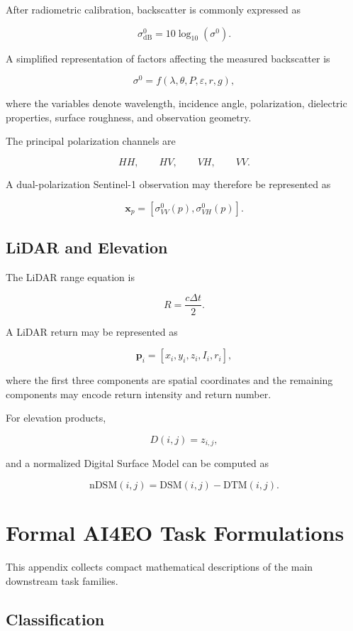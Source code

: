 \documentclass[
    11pt,
    a4paper,
    parskip=half,
    bibliography=totoc,
    numbers=noenddot
]{scrartcl}
\begin{document}
After radiometric calibration, backscatter is commonly expressed as

\[
\sigma^0_{\mathrm{dB}}
=
10\log_{10}(\sigma^0).
\]

A simplified representation of factors affecting the measured
backscatter is

\[
\sigma^0 =
f(\lambda,\theta,P,\varepsilon,r,g),
\]

where the variables denote wavelength, incidence angle, polarization,
dielectric properties, surface roughness, and observation geometry.

The principal polarization channels are

\[
HH,\qquad HV,\qquad VH,\qquad VV.
\]

A dual-polarization Sentinel-1 observation may therefore be represented as

\[
\mathbf{x}_p =
\left[
\sigma^0_{VV}(p),
\sigma^0_{VH}(p)
\right].
\]

\subsection{LiDAR and Elevation}

The LiDAR range equation is

\[
R=\frac{c\Delta t}{2}.
\]

A LiDAR return may be represented as

\[
\mathbf{p}_i=
[x_i,y_i,z_i,I_i,r_i],
\]

where the first three components are spatial coordinates and the
remaining components may encode return intensity and return number.

For elevation products,

\[
D(i,j)=z_{i,j},
\]

and a normalized Digital Surface Model can be computed as

\[
\mathrm{nDSM}(i,j)=\mathrm{DSM}(i,j)-\mathrm{DTM}(i,j).
\]

\section{Formal AI4EO Task Formulations}
\label{app:task-formulations}

This appendix collects compact mathematical descriptions of the main
downstream task families.

\subsection{Classification}
\end{document}
